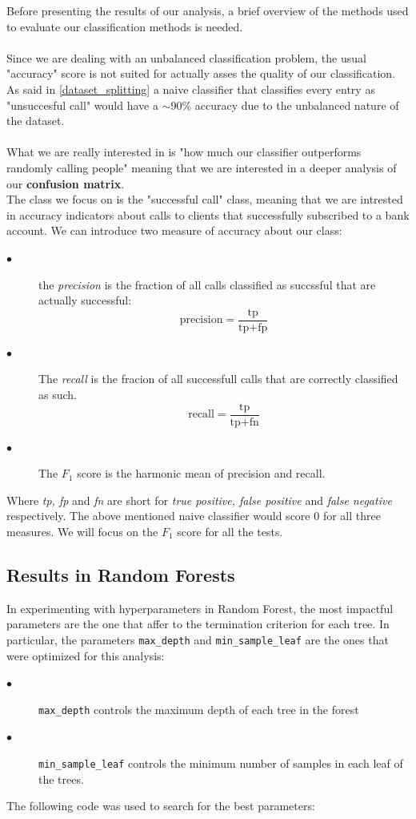 Before presenting the results of our analysis, a brief overview of the methods used to evaluate our classification methods is needed. \\
\\
Since we are dealing with an unbalanced classification problem, the usual "accuracy" score is not suited for actually asses the quality of our classification. As said in \ref{dataset_splitting} a naive classifier that classifies every entry as "unsuccesful call" would have a \(\sim 90\%\) accuracy due to the unbalanced nature of the dataset.\\
\\
What we are really interested in is "how much our classifier outperforms randomly calling people" meaning that we are interested in a deeper analysis of our \textbf{confusion matrix}.
\\
The class we focus on is the "successful call" class, meaning that we are intrested in accuracy indicators about calls to clients that successfully subscribed to a bank account. We can introduce two measure of accuracy about our class:
\begin{description}
    \item [\(\bullet\)] the \textit{precision} is the fraction of all calls classified as succssful that are actually successful: \begin{equation}
        \text{precision} = \frac{\text{tp}}{\text{tp}+\text{fp}}
    \end{equation}
    \item[\(\bullet\)] The \textit{recall} is the fracion of all successfull calls that are correctly classified as such. \begin{equation*}
        \text{recall} = \frac{\text{tp}}{\text{tp} + \text{fn}}
    \end{equation*} 
    \item[\(\bullet\)] The \(F_1\) score is the harmonic mean of precision and recall.
\end{description}
Where \textit{tp, fp} and \textit{fn} are short for \textit{true positive, false positive} and \textit{false negative} respectively.
The above mentioned naive classifier would score \(0\) for all three measures. We will focus on the \(F_1\) score for all the tests.
\subsection{Results in Random Forests}
In experimenting with hyperparameters in Random Forest, the most impactful parameters are the one that affer to the termination criterion for each tree. In particular, the parameters \texttt{max\_depth} and \texttt{min\_sample\_leaf} are the ones that were optimized for this analysis:
\begin{description}
    \item[\(\bullet\)] \texttt{max\_depth} controls the maximum depth of each tree in the forest \\
    \item[\(\bullet\)] \texttt{min\_sample\_leaf} controls the minimum number of samples in each leaf of the trees.
\end{description}
The following code was used to search for the best parameters:

